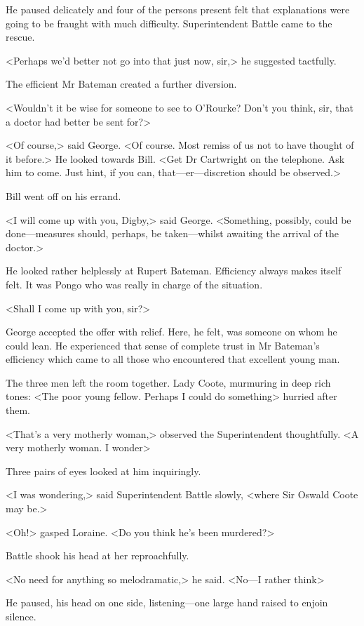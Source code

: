 He paused delicately and four of the persons present felt that explanations were going to be fraught with much difficulty. Superintendent Battle came to the rescue.

<Perhaps we'd better not go into that just now, sir,> he suggested tactfully.

The efficient Mr Bateman created a further diversion.

<Wouldn't it be wise for someone to see to O'Rourke? Don't you think, sir, that a doctor had better be sent for?>

<Of course,> said George. <Of course. Most remiss of us not to have thought of it before.> He looked towards Bill. <Get Dr Cartwright on the telephone. Ask him to come. Just hint, if you can, that—er—discretion should be observed.>

Bill went off on his errand.

<I will come up with you, Digby,> said George. <Something, possibly, could be done—measures should, perhaps, be taken—whilst awaiting the arrival of the doctor.>

He looked rather helplessly at Rupert Bateman. Efficiency always makes itself felt. It was Pongo who was really in charge of the situation.

<Shall I come up with you, sir?>

George accepted the offer with relief. Here, he felt, was someone on whom he could lean. He experienced that sense of complete trust in Mr Bateman's efficiency which came to all those who encountered that excellent young man.

The three men left the room together. Lady Coote, murmuring in deep rich tones: <The poor young fellow. Perhaps I could do something\longdash> hurried after them.

<That's a very motherly woman,> observed the Superintendent thoughtfully. <A very motherly woman. I wonder\longdash>

Three pairs of eyes looked at him inquiringly.

<I was wondering,> said Superintendent Battle slowly, <where Sir Oswald Coote may be.>

<Oh!> gasped Loraine. <Do you think he's been murdered?>

Battle shook his head at her reproachfully.

<No need for anything so melodramatic,> he said. <No—I rather think\longdash>

He paused, his head on one side, listening—one large hand raised to enjoin silence.

